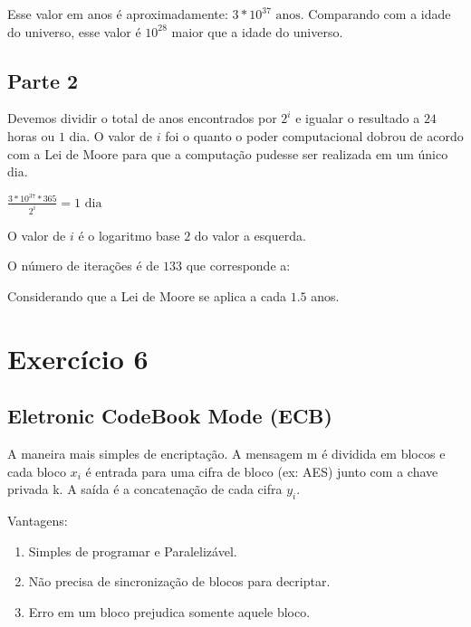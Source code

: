 \documentclass[a4paper]{article}
\begin{document}

Esse valor em anos é aproximadamente: $3 * 10^{37}\text{ anos}$. Comparando com a idade do universo, esse
valor é $10^{28}$ maior que a idade do universo.

\subsection{Parte 2}

Devemos dividir o total de anos encontrados por $2^i$ e igualar o resultado a $24$ horas ou $1$ dia. O valor de $i$ foi
o quanto o poder computacional dobrou de acordo com a Lei de Moore para que a computação pudesse ser realizada em um único dia.

$\frac{3 * 10^{37} * 365}{2^i} = 1\text{ dia}$

O valor de $i$ é o logaritmo base $2$ do valor a esquerda.


O número de iterações é de $133$ que corresponde a:

\newline
\newline
Considerando que a Lei de Moore se aplica a cada $1.5$ anos.

\section{Exercício 6}\label{sec:Ex6}

\subsection{Eletronic CodeBook Mode (ECB)}

A maneira mais simples de encriptação. A mensagem m é dividida em blocos e cada bloco $x_i$ é entrada para uma
cifra de bloco (ex: AES) junto com a chave privada k. A saída é a concatenação de cada cifra $y_i$.

Vantagens:

\begin{enumerate}
\item Simples de programar e Paralelizável.
\item Não precisa de sincronização de blocos para decriptar.
\item Erro em um bloco prejudica somente aquele bloco.
\end{enumerate}
\end{document}
